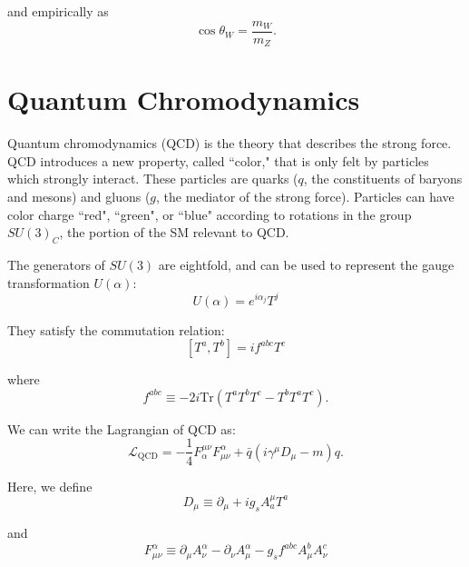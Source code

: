 \noindent and empirically as~\cite{halzen}
\begin{equation}
\cos \theta_{W} = \frac{m_{W}}{m_{Z}}.
\end{equation}

\section{Quantum Chromodynamics}

Quantum chromodynamics (QCD) is the theory that describes the strong force. QCD introduces a new property, called ``color," that is only felt by particles which strongly interact. These particles are quarks ($q$, the constituents of baryons and mesons) and gluons ($g$, the mediator of the strong force). Particles can have color charge ``red", ``green", or ``blue" according to rotations in the group $SU(3)_{C}$, the portion of the SM relevant to QCD.

The generators of $SU(3)$ are eightfold, and can be used to represent the gauge transformation $U(\alpha)$:
\begin{equation}
U(\alpha) = e^{i\alpha_{j}}T^{j}
\end{equation}

\noindent They satisfy the commutation relation:
\begin{equation}
\left[T^{a}, T^{b}\right] = if^{abc}T^{c}
\end{equation}

\noindent where 
\begin{equation}
f^{abc} \equiv -2i\text{Tr}\left(T^{a}T^{b}T^{c} - T^{b}T^{a}T^{c}\right).
\end{equation}

\noindent We can write the Lagrangian of QCD as\cite{halzen}:
\begin{equation}
\mathcal{L}_{\text{QCD}} = -\frac{1}{4}F^{\mu\nu}_{\alpha}F^{\alpha}_{\mu\nu} + \bar{q}\left(i\gamma^{\mu}D_{\mu} - m\right)q.
\end{equation}

\noindent Here, we define
\begin{equation}
D_{\mu} \equiv \partial_{\mu} + ig_{s}A^{\mu}_{a}T^{a}
\end{equation}

\noindent and
\begin{equation}
F^{\alpha}_{\mu\nu} \equiv \partial_{\mu}A^{\alpha}_{\nu} - \partial_{\nu}A^{\alpha}_{\mu} - g_{s}f^{abc}A^{b}_{\mu}A^{c}_{\nu}
\end{equation}

